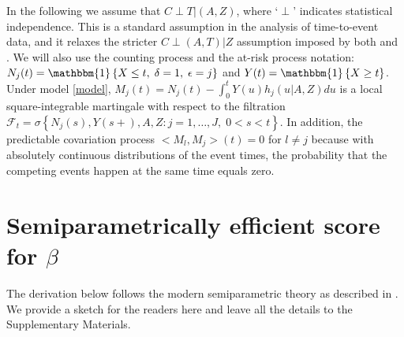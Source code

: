 \documentclass[11pt]{article}
\begin{document}
In the following we assume that $C \perp T  | (A,Z)$, where `$\perp$'  indicates statistical independence. This is a standard assumption  in the analysis of time-to-event data, and it relaxes the stricter $C \perp (A, T)  | Z$ assumption imposed by both \cite{hou2019estimating} and \cite{Dukes:19}.
We will also use the counting process and the at-risk process notation: $N_{j}(t)=\mathbbm{1}\left\{X\leq t, \; \delta=1,\;\epsilon=j\right\}$ and $Y(t)=\mathbbm{1}\left\{X\geq t\right\}$.
Under model \eqref{model}, $M_{j}(t)=N_{j}(t)-  \int_0^t Y(u) h_j(u | A, Z)du$ is a 
local square-integrable martingale with respect to the filtration \\$\mathcal{F}_t=\sigma\left\{N_{j}(s), Y(s+), A, Z : j=1,\ldots,J, \; %
0<s<t\right\}$.
In addition, the predictable covariation process $< M_l, M_j>(t) =0$ for $l \neq j$ because
with absolutely continuous distributions of the event times, 
the probability that the competing events happen at the same time equals zero.







\section{Semiparametrically efficient score for $\beta$}\label{eff}


The derivation below follows the modern semiparametric theory as described in \cite{tsiatis2007semiparametric}. We provide a sketch for the readers here and leave all the details  %
to the Supplementary Materials.
\end{document}

